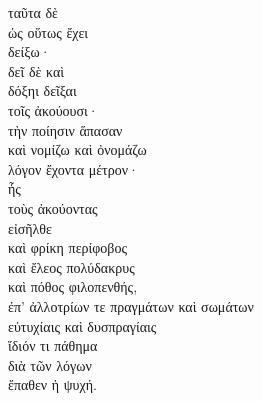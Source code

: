 {\large
\begin{greek}
\noindent ταῦτα δὲ \\
\tabto{2em} ὡς οὕτως ἔχει \\
δείξω·\\
δεῖ δὲ καὶ 	\\
\tabto{2em} δόξηι δεῖξαι \\
\tabto{2em} τοῖς ἀκούουσι·\\
τὴν ποίησιν ἅπασαν \\
καὶ νομίζω καὶ ὀνομάζω \\
\tabto{2em} λόγον ἔχοντα μέτρον·\\
\tabto{4em} ἧς \\
\tabto{4em} τοὺς ἀκούοντας \\
\tabto{4em} εἰσῆλθε \\
\tabto{6em} καὶ φρίκη περίφοβος \\
\tabto{6em} καὶ ἔλεος πολύδακρυς \\
\tabto{6em} καὶ πόθος φιλοπενθής, \\
\tabto{4em} ἐπ' ἀλλοτρίων τε πραγμάτων καὶ σωμάτων \\
\tabto{6em} εὐτυχίαις καὶ δυσπραγίαις \\
\tabto{4em} ἴδιόν τι πάθημα \\
\tabto{6em} διὰ τῶν λόγων \\
\tabto{4em} ἔπαθεν ἡ ψυχή.\\

\end{greek}
}

